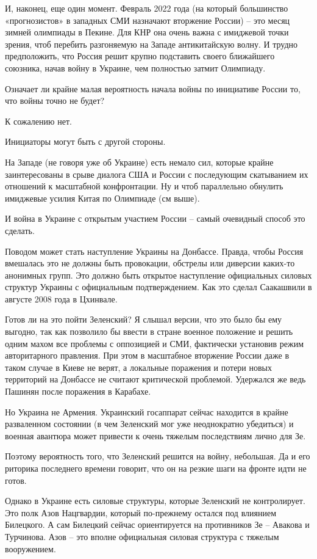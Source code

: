 И, наконец, еще один момент. Февраль 2022 года (на который большинство
«прогнозистов» в западных СМИ назначают вторжение России) – это месяц зимней
олимпиады в Пекине. Для КНР она очень важна с имиджевой точки зрения, чтоб
перебить разгоняемую на Западе антикитайскую волну. И трудно предположить, что
Россия решит крупно подставить своего ближайшего союзника, начав войну в
Украине, чем полностью затмит Олимпиаду.

Означает ли крайне малая вероятность начала войны по инициативе России то, что
войны точно не будет?

К сожалению нет.

Инициаторы могут быть с другой стороны.

На Западе (не говоря уже об Украине) есть немало сил, которые крайне
заинтересованы в срыве диалога США и России с последующим скатыванием их
отношений к масштабной конфронтации. Ну и чтоб параллельно обнулить имиджевые
усилия Китая по Олимпиаде (см выше).

И война в Украине с открытым участием России – самый очевидный способ это
сделать.

Поводом может стать наступление Украины на Донбассе. Правда, чтобы Россия
вмешалась это не должны быть провокации, обстрелы или диверсии каких-то
анонимных групп. Это должно быть открытое наступление официальных силовых
структур Украины с официальным подтверждением. Как это сделал Саакашвили в
августе 2008 года в Цхинвале.

Готов ли на это пойти Зеленский? Я слышал версии, что это было бы ему выгодно,
так как позволило бы ввести в стране военное положение и решить одним махом все
проблемы с оппозицией и СМИ, фактически установив режим авторитарного
правления. При этом в масштабное вторжение России даже в таком случае в Киеве
не верят, а локальные поражения и потери новых территорий на Донбассе не
считают критической проблемой. Удержался же ведь Пашинян после поражения в
Карабахе.  

Но Украина не Армения. Украинский госаппарат сейчас находится в крайне
разваленном состоянии (в чем Зеленский мог уже неоднократно убедиться) и
военная авантюра может привести к очень тяжелым последствиям лично для Зе.

Поэтому вероятность того, что Зеленский решится на войну, небольшая. Да и его
риторика последнего времени говорит, что он на резкие шаги на фронте идти не
готов.

Однако в Украине есть силовые структуры, которые Зеленский не контролирует. Это
полк Азов Нацгвардии, который по-прежнему остался под влиянием Билецкого. А сам
Билецкий сейчас ориентируется на противников Зе – Авакова и Турчинова. Азов –
это вполне официальная силовая структура с тяжелым вооружением.

